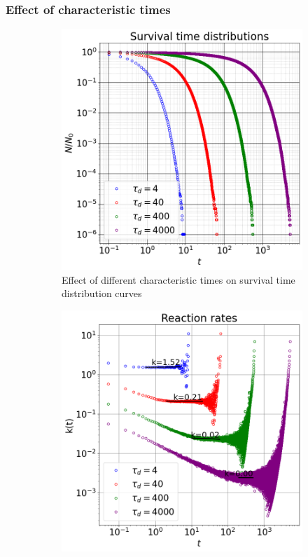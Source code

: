 \documentclass{article}
\begin{document}
\subsubsection{Effect of characteristic times}
\begin{figure}[htbp]
    \centering
    \begin{subfigure}[b]{0.48\textwidth}
        \centering
        \includegraphics[width=\textwidth]{images/survTimeDistCompareTau.png}
        \caption{Effect of different characteristic times on survival time distribution curves}
    \end{subfigure}
    \hfill
    \begin{subfigure}[b]{0.48\textwidth}
        \centering
        \includegraphics[width=\textwidth]{images/ratesCompareTau.png}

\end{subfigure}
\end{figure}
\end{document}
